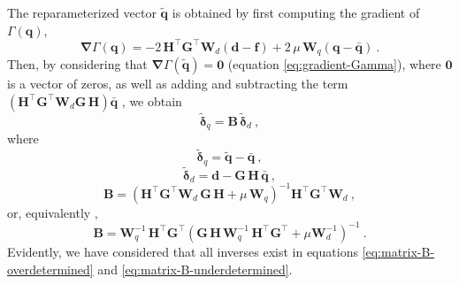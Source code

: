 The reparameterized vector $\tilde{\mathbf{q}}$ is obtained by first computing the gradient of $\Gamma(\mathbf{q})$,
\begin{equation}
	\boldsymbol{\nabla} \Gamma(\mathbf{q}) = 
	-2 \, \mathbf{H}^{\top}\mathbf{G}^{\top} \mathbf{W}_{d} \left(\mathbf{d} - \mathbf{f} \right) +
	2 \, \mu \, \mathbf{W}_{q} \left( \mathbf{q} - \bar{\mathbf{q}} \right) \: .
	\label{eq:gradient-Gamma}
\end{equation}
Then, by considering that $\boldsymbol{\nabla} \Gamma(\tilde{\mathbf{q}}) = \mathbf{0}$ (equation \ref{eq:gradient-Gamma}),
where $\mathbf{0}$ is a vector of zeros, as well as adding and subtracting the term
$\left( \mathbf{H}^{\top}\mathbf{G}^{\top}\mathbf{W}_{d} \mathbf{G} \, \mathbf{H} \right) \bar{\mathbf{q}}$ ,
we obtain
\begin{equation}
	\tilde{\boldsymbol{\delta}}_{q} = \mathbf{B} \, \tilde{\boldsymbol{\delta}}_{d} \: ,
	\label{eq:vector-q-tilde}
\end{equation}
where 
\begin{equation}
	\tilde{\boldsymbol{\delta}}_{q} = \tilde{\mathbf{q}} - \bar{\mathbf{q}} \: ,
	\label{eq:delta-q-tilde}
\end{equation}
\begin{equation}
	\tilde{\boldsymbol{\delta}}_{d} = \mathbf{d} - \mathbf{G} \, \mathbf{H} \, \bar{\mathbf{q}} \: ,
	\label{eq:delta-d}
\end{equation}
\begin{equation}
	\mathbf{B} = \left( \mathbf{H}^{\top} \mathbf{G}^{\top} \mathbf{W}_{d} \, \mathbf{G} \, \mathbf{H} + 
	\mu \, \mathbf{W}_{q} \right)^{-1}
	\mathbf{H}^{\top} \mathbf{G}^{\top} \mathbf{W}_{d} \: ,
	\label{eq:matrix-B-overdetermined}
\end{equation}
or, equivalently \cite[][p. 62]{menke2018},
\begin{equation}
	\mathbf{B} = \mathbf{W}_{q}^{-1} \, \mathbf{H}^{\top} \mathbf{G}^{\top}
	\left( \mathbf{G} \, \mathbf{H} \, \mathbf{W}_{q}^{-1} \,
	\mathbf{H}^{\top}\mathbf{G}^{\top} + \mu \mathbf{W}_{d}^{-1} \right)^{-1} \: .
	\label{eq:matrix-B-underdetermined}
\end{equation}
Evidently, we have considered that all inverses exist in equations \ref{eq:matrix-B-overdetermined} and \ref{eq:matrix-B-underdetermined}.

